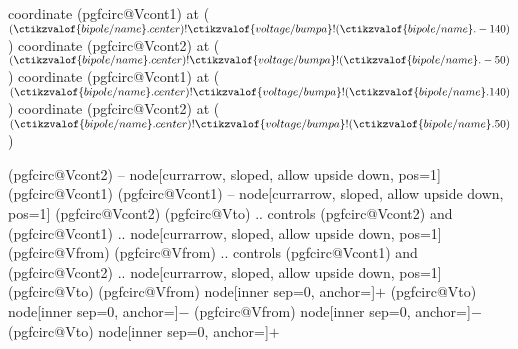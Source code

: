 {    \ifpgf@circuit@germanvoltage
      \ifpgf@circuit@bipole@voltage@below
        coordinate (pgfcirc@Vcont1) at ($(\ctikzvalof{bipole/name}.center) ! \ctikzvalof{voltage/bump a} ! (\ctikzvalof{bipole/name}.-140)$)
        coordinate (pgfcirc@Vcont2) at ($(\ctikzvalof{bipole/name}.center) ! \ctikzvalof{voltage/bump a} ! (\ctikzvalof{bipole/name}.-50)$)
    \else
        coordinate (pgfcirc@Vcont1) at ($ (\ctikzvalof{bipole/name}.center) ! \ctikzvalof{voltage/bump a} ! (\ctikzvalof{bipole/name}.140)$)
        coordinate (pgfcirc@Vcont2) at ($ (\ctikzvalof{bipole/name}.center) ! \ctikzvalof{voltage/bump a} ! (\ctikzvalof{bipole/name}.50)$)
      \fi
    \fi

    \ifpgf@circuit@europeanvoltage
        \ifpgf@circuit@germanvoltage
          \ifpgf@circuit@bipole@voltage@backward
            (pgfcirc@Vcont2)  -- node[currarrow, sloped,  allow upside down, pos=1] {} (pgfcirc@Vcont1)
          \else
            (pgfcirc@Vcont1)  -- node[currarrow, sloped,  allow upside down, pos=1] {} (pgfcirc@Vcont2)
          \fi
        \else
          \ifpgf@circuit@bipole@voltage@backward
            (pgfcirc@Vto) .. controls (pgfcirc@Vcont2)  and (pgfcirc@Vcont1) .. 
                node[currarrow, sloped,  allow upside down, pos=1] {} 
            (pgfcirc@Vfrom) 
          \else
            (pgfcirc@Vfrom) .. controls (pgfcirc@Vcont1)  and (pgfcirc@Vcont2) ..
                node[currarrow, sloped,  allow upside down, pos=1] {}
            (pgfcirc@Vto)   
          \fi  
        \fi      
    \else
        \ifpgf@circuit@bipole@voltage@backward
            (pgfcirc@Vfrom) node[inner sep=0, anchor=\pgf@circ@bipole@voltage@label@anchor]{\scriptsize$+$}   
            (pgfcirc@Vto) node[inner sep=0, anchor=\pgf@circ@bipole@voltage@label@anchor]{$-$}
        \else
            (pgfcirc@Vfrom) node[inner sep=0, anchor=\pgf@circ@bipole@voltage@label@anchor]{\scriptsize$-$}   
            (pgfcirc@Vto) node[inner sep=0, anchor=\pgf@circ@bipole@voltage@label@anchor]{$+$}
        \fi 
    \fi
}
\makeatother
